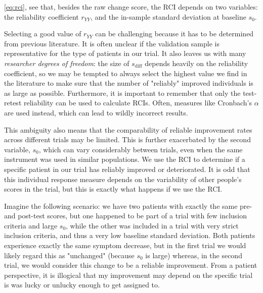 \begin{box-info-continued}

 \ref{eq:rci}, see that, besides the raw change score, the RCI depends on two variables: the reliability coefficient $r_{YY}$, and the in-sample standard deviation at baseline $s_{0}$.

\vspace{2mm}

\hspace*{5mm} Selecting a good value of $r_{YY}$ can be challenging because it has to be determined from previous literature. It is often unclear if the validation sample is representative for the type of patients in our trial. It also leaves us with many \emph{researcher degrees of freedom}: the size of $s_{\text{diff}}$ depends heavily on the reliability coefficient, so we may be tempted to always select the highest value we find in the literature to make sure that the number of "reliably" improved individuals is as large as possible. Furthermore, it is important to remember that only the test-retest reliability can be used to calculate RCIs. Often, measures like Cronbach's $\alpha$ are used instead, which can lead to wildly incorrect results. 

\vspace{2mm}

\hspace*{5mm} This ambiguity also means that the comparability of reliable improvement rates across different trials may be limited. This is further exacerbated by the second variable, $s_{0}$, which can vary considerably between trials, even when the same instrument was used in similar populations. We use the RCI to determine if a specific patient in our trial has reliably improved or deteriorated. It is odd that this individual response measure depends on the variability of other people's scores in the trial, but this is exactly what happens if we use the RCI. 

\vspace{2mm}

\hspace*{5mm} Imagine the following scenario: we have two patients with exactly the same pre- and post-test scores, but one happened to be part of a trial with few inclusion criteria and large $s_{0}$, while the other was included in a trial with very strict inclusion criteria, and thus a very low baseline standard deviation. Both patients experience exactly the same symptom decrease, but in the first trial we would likely regard this as "unchanged" (because $s_{0}$ is large) whereas, in the second trial, we would consider this change to be a reliable improvement. From a patient perspective, it is illogical that my improvement may depend on the specific trial is was lucky or unlucky enough to get assigned to. 


\end{box-info-continued}
